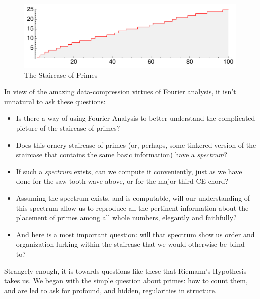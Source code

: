 \documentclass[11pt]{article}
\theoremstyle{plain}
\theoremstyle{definition}
\numberwithin{equation}{section}
\numberwithin{figure}{section}
\numberwithin{table}{section}
\begin{document}
\begin{figure}[H]
\begin{center}
\includegraphics[width=\textwidth]{illustrations/prime_pi_100_aspect1}
\caption{The Staircase of Primes\label{fig:staircase100}}
\end{center}
\end{figure}

 
 In view of the amazing data-compression virtues of Fourier analysis, it isn't unnatural to ask these questions:

 \begin{itemize}
  \item Is there a way of using Fourier Analysis to better understand the complicated picture of the staircase
of primes?
 
  \item Does this ornery staircase
of primes  (or, perhaps, some tinkered version of the staircase that contains the same basic information) have a {\it spectrum}?

  \item  If  such a {\it spectrum} exists, can we compute it conveniently, just as we have done for the saw-tooth wave above,
or for the major third CE chord?
 

  \item  Assuming the spectrum exists, and is computable, will our understanding of this spectrum allow us to reproduce all
the pertinent information about the placement of primes among all whole numbers, elegantly and
faithfully? 

  \item  And here is a most important question: will that spectrum show us order and organization
lurking within the staircase that we would otherwise be blind to? 
 

  \end{itemize}
   

 Strangely enough, it is towards questions like these that Riemann's Hypothesis  takes us. We began with the simple question about primes: how to count them, and are led to
ask for profound, and hidden, regularities in structure.
\end{document}
